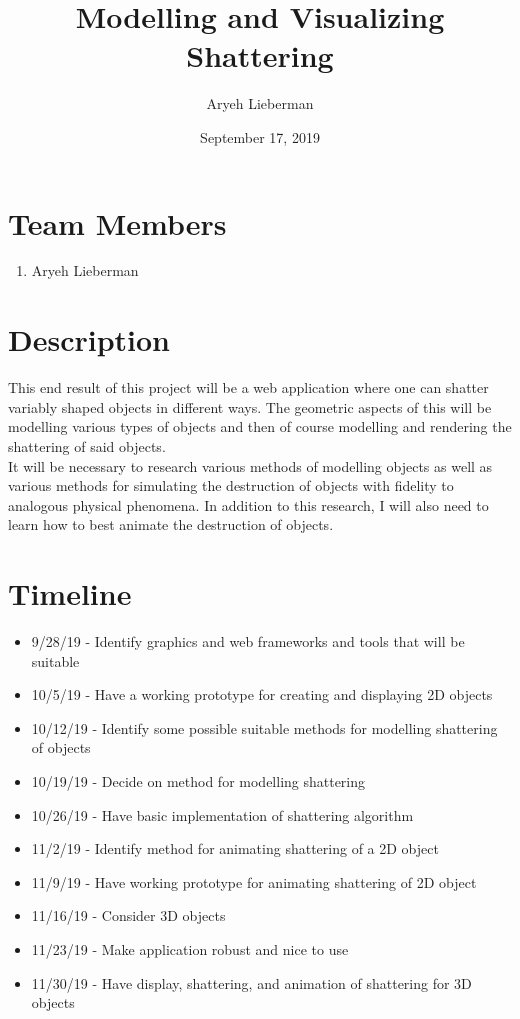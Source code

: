 \documentclass{article}
\author{Aryeh Lieberman}
\title{Modelling and Visualizing Shattering}
\date{September 17, 2019}
\begin{document}
\maketitle
\section{Team Members}
\begin{enumerate}
	\item Aryeh Lieberman
\end{enumerate}
\section{Description}
This end result of this project will be a web application where one can shatter variably shaped objects in different ways.  The geometric aspects of this will be modelling various types of objects and then of course modelling and rendering the shattering of said objects.\\
It will be necessary to research various methods of modelling objects as well as various methods for simulating the destruction of objects with fidelity to analogous physical phenomena.  In addition to this research, I will also need to learn how to best animate the destruction of objects.
\nocite{*}
\section{Timeline}
\begin{itemize}
	\item 9/28/19 - Identify graphics and web frameworks and tools that will be suitable
	\item 10/5/19 - Have a working prototype for creating and displaying 2D objects
	\item 10/12/19 - Identify some possible suitable methods for modelling shattering of objects
	\item 10/19/19 - Decide on method for modelling shattering
	\item 10/26/19 - Have basic implementation of shattering algorithm
	\item 11/2/19 - Identify method for animating shattering of a 2D object
	\item 11/9/19 - Have working prototype for animating shattering of 2D object
	\item 11/16/19 - Consider 3D objects
	\item 11/23/19 - Make application robust and nice to use
	\item 11/30/19 - Have display, shattering, and animation of shattering for 3D objects
\end{itemize}
{}

\end{document}
